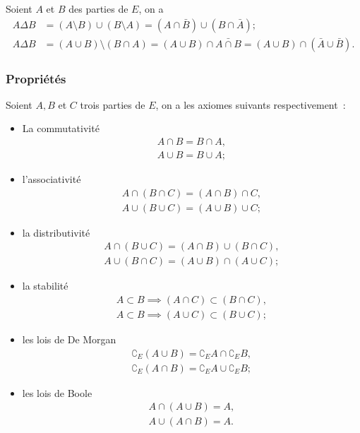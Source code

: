 \begin{prop}
    Soient \(A\) et \(B\) des parties de \(E\), on a 
    \begin{align}
        A \Delta B &= (A\setminus B) \cup (B \setminus A) = (A \cap \bar{B}) 
        \cup (B \cap \bar{A}); \\
        A \Delta B &= (A \cup B) \setminus (B \cap A) = (A \cup B) \cap \bar{A 
        \cap B}  = (A \cup B) \cap (\bar{A} \cup \bar{B}).
    \end{align}
\end{prop}

\subsubsection{Propriétés}
\label{chap3-subsubsec:prop}

\begin{axiome}
    Soient \(A, B\) et \(C\) trois parties de \(E\), on a les axiomes suivants 
    respectivement~:
    \begin{itemize}
        \item La commutativité
            \begin{gather}
                A \cap B= B \cap A, \\
                A \cup B = B \cup A;
            \end{gather}
        \item l'associativité
            \begin{gather}
                A \cap (B \cap C) = (A \cap B) \cap C, \\ 
                A \cup (B \cup C) = (A \cup B) \cup C;
            \end{gather}
        \item la distributivité
            \begin{gather}
                A \cap (B \cup C) = (A \cap B) \cup (B \cap C), \\ 
                A \cup (B \cap C) = (A \cup B) \cap (A \cup C);
            \end{gather}
        \item la stabilité
            \begin{gather}
                A \subset B \implies (A \cap C) \subset (B \cap C), \\ 
                A \subset B \implies (A \cup C) \subset (B \cup C);
            \end{gather}
        \item les lois de De Morgan
            \begin{gather}
                \complement_E (A \cup B) = \complement_E A \cap \complement_E B, \\ 
                \complement_E (A \cap B) = \complement_E A \cup \complement_E B;
            \end{gather}
        \item les lois de Boole
            \begin{gather}
                A \cap (A \cup B) = A, \\ 
                A \cup (A \cap B) = A.
            \end{gather}
    \end{itemize}
\end{axiome}

